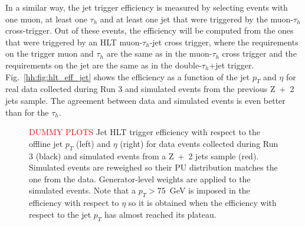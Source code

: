 \documentclass[../main.tex]{subfiles}
\begin{document}
In a similar way, the jet trigger efficiency is measured by selecting events with one muon, at least one $\tau_h$ and at least one jet that were triggered by the muon-$\tau_h$ cross-trigger. Out of these events, the efficiency will be computed from the ones that were triggered by an HLT muon-$\tau_h$-jet cross trigger, where the requirements on the trigger muon and $\tau_h$ are the same as in the muon-$\tau_h$ cross trigger and the requirements on the jet are the same as in the double-$\tau_h$+jet trigger. Fig.~\ref{hh:fig:hlt_eff_jet} shows the efficiency as a function of the jet $p_T$ and $\eta$ for real data collected during Run 3 and simulated events from the previous Z~+~2 jets sample. The agreement between data and simulated events is even better than for the $\tau_h$.

\begin{figure}[h!]
\begin{center}
\end{center}
\caption{\textcolor{red}{DUMMY PLOTS} Jet HLT trigger efficiency with respect to the offline jet $p_T$ (left) and $\eta$ (right) for data events collected during Run 3 (black) and simulated events from a Z~+~2 jets sample (red). Simulated events are reweighed so their PU distribution matches the one from the data. Generator-level weights are applied to the simulated events. Note that a $p_T>75$~GeV is imposed in the efficiency with respect to $\eta$ so it is obtained when the efficiency with respect to the jet $p_T$ has almost reached its plateau.}
\label{hh:fig:hlt_eff_tau}
\end{figure}
\end{document}
